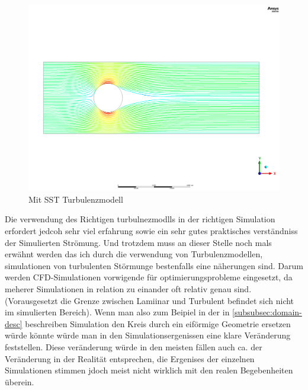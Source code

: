\begin{refsection}
\begin{figure}
    \includegraphics[width=\textwidth]{papers/reynolds/images/sst.png}
    \caption{Mit SST Turbulenzmodell}
    \label{fig:SST}
\end{figure}


Die verwendung des Richtigen turbulnezmodlls in der richtigen Simulation erfordert jedcoh sehr viel erfahrung sowie ein sehr gutes praktisches verständniss der Simulierten Strömung.
Und trotzdem muss an dieser Stelle noch mals erwähnt werden das ich durch die verwendung von Turbulenzmodellen, simulationen von turbulenten Störmunge bestenfalls eine näherungen sind.
Darum werden CFD-Simulationen vorwigende für optimierungsprobleme eingesetzt, da meherer Simulationen in relation zu einander oft relativ genau sind.
(Vorausgesetzt die Grenze zwischen Lamiinar und Turbulent befindet sich nicht im simulierten Bereich).
Wenn man also zum Beipiel in der in \ref{subsubsec:domain-desc} beschreiben Simulation den Kreis durch ein eiförmige Geometrie ersetzen würde könnte würde man in den Simulationsergenissen eine klare Veränderung feststellen.
Diese veränderung würde in den meisten fällen auch ca. der Veränderung in der Realität entsprechen, die Ergenises der einzelnen Simulationen stimmen jdoch meist nicht wirklich mit den realen Begebenheiten überein.


% 
% 
% 

\printbibliography[heading=subbibliography]
\end{refsection}
